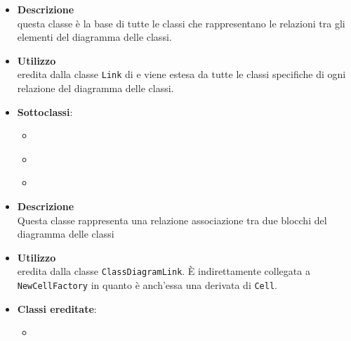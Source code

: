 \label{\nogloxy{swedesigner::client::model::celltypes::class::ClassDiagramLink}}
\begin{itemize}
\item \textbf{Descrizione}\\
questa classe è la base di tutte le classi che rappresentano le relazioni tra gli elementi del diagramma delle classi.
\item \textbf{Utilizzo}\\
eredita dalla classe \texttt{Link} di \jointjs{} e viene estesa da tutte le classi specifiche di ogni relazione del diagramma delle classi.
\item \textbf{Sottoclassi}:
\begin{itemize}
\item \hyperref[\nogloxy{swedesigner::client::model::celltypes::class::HxAssociation}]{}
\item \hyperref[\nogloxy{swedesigner::client::model::celltypes::class::HxGeneralization}]{}
\item \hyperref[\nogloxy{swedesigner::client::model::celltypes::class::HxImplementation}]{}
\end{itemize}
\end{itemize}

\label{\nogloxy{swedesigner::client::model::celltypes::class::HxAssociation}}
\begin{itemize}
\item \textbf{Descrizione}\\
Questa classe rappresenta una relazione associazione tra due blocchi del diagramma delle classi
\item \textbf{Utilizzo}\\
eredita dalla classe \texttt{ClassDiagramLink}. È indirettamente collegata a \texttt{NewCellFactory} in quanto è anch'essa una derivata di \texttt{Cell}.
\item \textbf{Classi ereditate}:
\begin{itemize}
\item \hyperref[\nogloxy{swedesigner::client::model::celltypes::class::ClassDiagramLink}]{}
\end{itemize}
\end{itemize}

